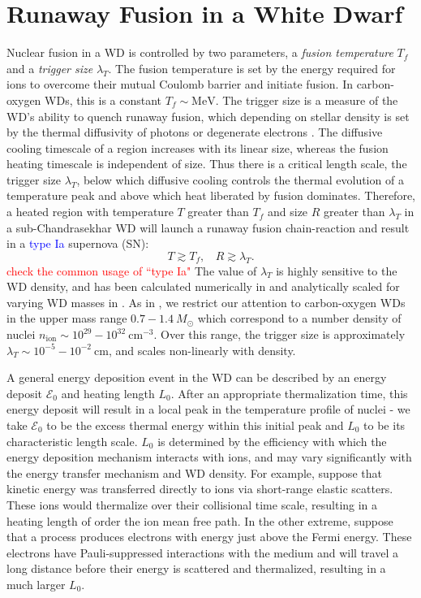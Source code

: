 \documentclass[twocolumn,showpacs,preprintnumbers,amsmath,amssymb,prd]{revtex4}
\newcommand{\MeV}{\text{MeV}}
\newcommand{\cm}{\text{cm}}
\begin{document}
\section{Runaway Fusion in a White Dwarf}
\label{sec:Review}

Nuclear fusion in a WD is controlled by two parameters, a \emph{fusion temperature} $T_f$ and a \emph{trigger size} $\lambda_T$.  The fusion temperature is set by the energy required for ions to overcome their mutual Coulomb barrier and initiate fusion.  In carbon-oxygen WDs, this is a constant $T_f \sim \MeV$.  The trigger size is a measure of the WD's ability to quench runaway fusion, which depending on stellar density is set by the thermal diffusivity of photons or degenerate electrons \cite{Woosley}.  The diffusive cooling timescale of a region increases with its linear size, whereas the fusion heating timescale is independent of size.  Thus there is a critical length scale, the trigger size $\lambda_T$, below which diffusive cooling controls the thermal evolution of a temperature peak and above which heat liberated by fusion dominates. Therefore, a heated region with temperature $T$ greater than $T_f$ and size $R$ greater than $\lambda_T$ in a sub-Chandrasekhar WD will launch a runaway fusion chain-reaction and result in a \textcolor{blue}{type Ia} supernova (SN):
\begin{equation}
\label{eq:runaway}
  T \gtrsim T_f, ~~~~ R \gtrsim \lambda_T.
\end{equation}
\textcolor{red}{check the common usage of ``type Ia"}  The value of $\lambda_T$ is highly sensitive to the WD density, and has been calculated numerically in \cite{Woosley} and analytically scaled for varying WD masses in \cite{Graham:2015apa}. As in \cite{Graham:2015apa}, we restrict our attention to carbon-oxygen WDs in the upper mass range $0.7 - 1.4 ~M_{\odot}$ which correspond to a number density of nuclei $n_\text{ion} \sim 10^{29} - 10^{32} ~\cm^{-3}$. Over this range, the trigger size is approximately $\lambda_T \sim 10^{-5} - 10^{-2} ~\text{cm}$, and scales non-linearly with density.

A general energy deposition event in the WD can be described by an energy deposit $\mathcal{E}_0$ and heating length $L_0$.  After an appropriate thermalization time, this energy deposit will result in a local peak in the temperature profile of nuclei - we take $\mathcal{E}_0$ to be the excess thermal energy within this initial peak and $L_0$ to be its characteristic length scale.  $L_0$ is determined by the efficiency with which the energy deposition mechanism interacts with ions, and may vary significantly with the energy transfer mechanism and WD density.  For example, suppose that kinetic energy was transferred directly to ions via short-range elastic scatters. These ions would thermalize over their collisional time scale, resulting in a heating length of order the ion mean free path. In the other extreme, suppose that a process produces electrons with energy just above the Fermi energy.  These electrons have Pauli-suppressed interactions with the medium and will travel a long distance before their energy is scattered and thermalized, resulting in a much larger $L_0$.
\end{document}
